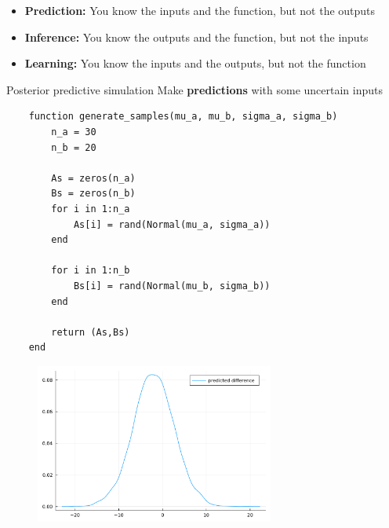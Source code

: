 \documentclass[aspectratio=169,xcolor=svgnames]{beamer}
\begin{document}
\begin{frame}
  \begin{itemize}
  \item \textbf{Prediction:} You know the inputs and the function, but not the outputs
  \item \textbf{Inference:} You know the outputs and the function, but not the inputs
  \item \textbf{Learning:} You know the inputs and the outputs, but not the function
  \end{itemize}

  \begin{block}{Posterior predictive simulation}
    Make \textbf{predictions} with some uncertain inputs
  \end{block}
\end{frame}

\begin{frame}[fragile]
    \begin{verbatim}
    function generate_samples(mu_a, mu_b, sigma_a, sigma_b)
        n_a = 30
        n_b = 20

        As = zeros(n_a)
        Bs = zeros(n_b)
        for i in 1:n_a
            As[i] = rand(Normal(mu_a, sigma_a))
        end

        for i in 1:n_b
            Bs[i] = rand(Normal(mu_b, sigma_b))
        end

        return (As,Bs)
    end
    \end{verbatim}
\end{frame}

\begin{frame}
\begin{figure}[ht]
  \centering
  \includegraphics[width=0.7\textwidth]{figures/predicted_difference_a_b.pdf}
\end{figure}
\end{frame}
\end{document}
